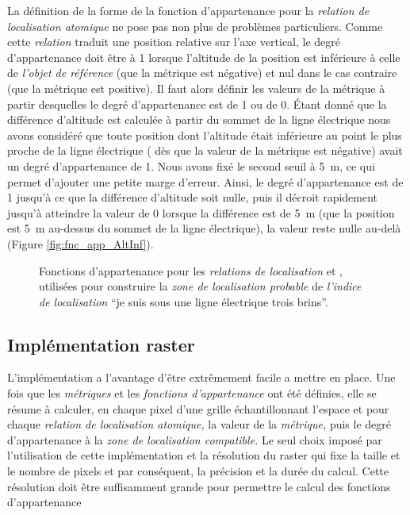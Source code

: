 La définition de la forme de la fonction d'appartenance pour la
\emph{relation de localisation atomique}
 ne pose
pas non plus de problèmes particuliers. Comme cette \emph{relation}
traduit une position relative sur l'axe vertical, le degré
d'appartenance doit être à 1 lorsque l'altitude de la position est
inférieure à celle de \emph{l'objet de référence} (\ie que la métrique
est négative) et nul dans le cas contraire (\ie que la métrique est
positive). Il faut alors définir les valeurs de la métrique à partir
desquelles le degré d'appartenance est de 1 ou de 0. Étant donné que
la différence d'altitude est calculée à partir du sommet de la ligne
électrique nous avons considéré que toute position dont l'altitude
était inférieure au point le plus proche de la ligne électrique (\ie
dès que la valeur de la métrique est négative) avait un degré
d'appartenance de 1. Nous avons fixé le second seuil à \SI{5}{\meter},
ce qui permet d'ajouter une petite marge d'erreur. Ainsi, le degré
d'appartenance est de 1 jusqu’à ce que la différence d'altitude soit
nulle, puis il décroit rapidement jusqu'à atteindre la valeur de 0
lorsque la différence est de \SI{5}{\meter} (\ie que la position est
\SI{5}{\meter} au-dessus du sommet de la ligne électrique), la valeur
reste nulle au-delà (Figure \ref{fig:fnc_app_AltInf}).

\begin{figure}
  \centering
  \subfloat{%
    
    \label{fig:fnc_app_Dist}
  }
  \hfill%
  \subfloat{%
    
    \label{fig:fnc_app_AltInf}
  }
  \caption{Fonctions d'appartenance pour les \emph{relations de
      localisation}
    \protect{}
    et
    \protect{},
    utilisées pour construire la \emph{zone de localisation probable}
    de \emph{l'indice de localisation} \enquote{je suis sous une ligne
      électrique trois brins}.}
  \label{fig:fnc_app_sousProche}
\end{figure}

\subsection{Implémentation raster}

L'implémentation a l'avantage d'être extrêmement facile a mettre en
place. Une fois que les \emph{métriques} et les \emph{fonctions
  d’appartenance} ont été définies, elle se résume à calculer, en
chaque pixel d'une grille échantillonnant l'espace et pour chaque
\emph{relation de localisation atomique,} la valeur de la
\emph{métrique,} puis le degré d'appartenance à la \emph{zone de
  localisation compatible.} Le seul choix imposé par l'utilisation de
cette implémentation et la résolution du raster qui fixe la taille et
le nombre de pixels et par conséquent, la précision et la durée du
calcul. Cette résolution doit être suffisamment grande pour permettre
le calcul des fonctions d'appartenance

